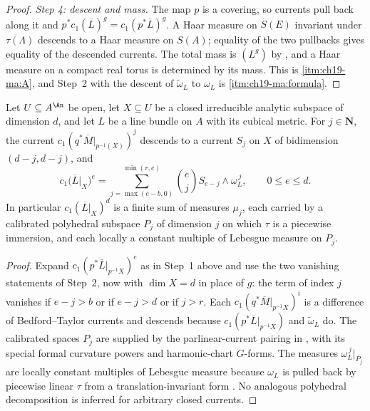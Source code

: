 \begin{proof}
\emph{Step 4: descent and mass.}  The map $p$ is a covering, so currents
pull back along it and $p^*c_1(\overline L)^g=c_1(p^*\overline L)^g$.  A
Haar measure on $S(E)$ invariant under $\tau(\Lambda)$ descends to a Haar
measure on $S(A)$; equality of the two pullbacks gives equality of the
descended currents.  The total mass is $(L^g)$ by
, and a Haar measure on a compact real torus
is determined by its mass.  This is \cref{itm:ch19-ma:A}, and Step~2 with the
descent of $\widetilde\omega_L$ to $\omega_L$ is
\cref{itm:ch19-ma:formula}.
\end{proof}

\begin{proposition}
\label{prop:ch19-canonical-subvariety}
Let $U\subseteq A^{\An}$ be open, let $X\subseteq U$ be a closed
irreducible analytic subspace of dimension $d$, and let $L$ be a line
bundle on $A$ with its cubical metric.  For $j\in\mathbf N$, the
current $c_1(q^*\overline M|_{p^{-1}(X)})^j$ descends to a current
$S_j$ on $X$ of bidimension $(d-j,d-j)$, and
\begin{equation}
\label{eq:ch19-canonical-subvariety}
 c_1\bigl(\overline L|_X\bigr)^{e}
 =\sum_{j=\max(e-b,0)}^{\min(r,e)}\binom{e}{j}S_{e-j}\wedge\omega_L^{\,j},
 \qquad 0\leq e\leq d .
\end{equation}
In particular $c_1(\overline L|_X)^d$ is a finite sum of measures
$\mu_j$, each carried by a calibrated polyhedral subspace $P_j$ of
dimension $j$ on which $\tau$ is a piecewise immersion, and each locally
a constant multiple of Lebesgue measure on $P_j$.
\end{proposition}

\begin{proof}
Expand $c_1(p^*\overline L|_{p^{-1}X})^{e}$ as in Step~1 above and use the
two vanishing statements of Step~2, now with $\dim X=d$ in place of $g$: the
term of index $j$ vanishes if $e-j>b$ or if $e-j>d$ or if $j>r$.  Each
$c_1(q^*\overline M|_{p^{-1}X})^{i}$ is a difference of Bedford--Taylor
currents and descends because $c_1(p^*\overline L|_{p^{-1}X})$ and
$\widetilde\omega_L$ do.  The calibrated spaces $P_j$ are supplied by the parlinear-current
pairing in \cite[Corollary~19.2.9]{CLD25}, with its special formal curvature
powers and harmonic-chart $G$-forms.  The measures
$\omega_L^{\,j}|_{P_j}$ are locally constant multiples of Lebesgue measure
because $\omega_L$ is pulled back by piecewise linear $\tau$ from a
translation-invariant form \cite[Remark~19.3.4]{CLD25}.  No analogous
polyhedral decomposition is inferred for arbitrary closed currents.
\end{proof}

